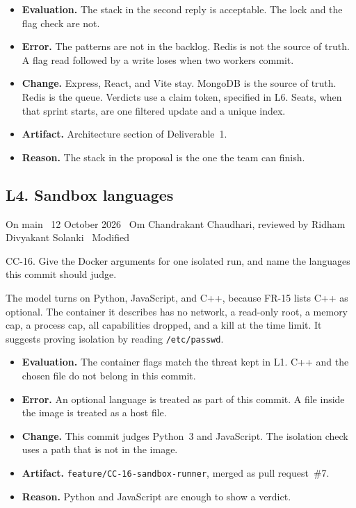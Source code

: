 \documentclass[11pt,a4paper]{article}
\newcommand{\meta}[1]{{\footnotesize\color{quiet}#1}\par\vspace{0.2em}}
\newcommand{\step}[1]{\par\vspace{0.45em}{\bfseries #1}\par\vspace{0.05em}}
\begin{document}
\step{5. Decision}
\begin{itemize}
\item \textbf{Evaluation.} The stack in the second reply is acceptable. The lock and the flag check are not.
\item \textbf{Error.} The patterns are not in the backlog. Redis is not the source of truth. A flag read followed by a write loses when two workers commit.
\item \textbf{Change.} Express, React, and Vite stay. MongoDB is the source of truth. Redis is the queue. Verdicts use a claim token, specified in L6. Seats, when that sprint starts, are one filtered update and a unique index.
\item \textbf{Artifact.} Architecture section of Deliverable~1.
\item \textbf{Reason.} The stack in the proposal is the one the team can finish.
\end{itemize}

\subsection{L4. Sandbox languages}
\meta{On main \textperiodcentered\ 12 October 2026 \textperiodcentered\ Om Chandrakant Chaudhari, reviewed by Ridham Divyakant Solanki \textperiodcentered\ Modified}

\step{1. Prompt}
CC-16. Give the Docker arguments for one isolated run, and name the languages this commit should judge.

\step{2. Reply (summarised)}
The model turns on Python, JavaScript, and C++, because FR-15 lists C++ as optional. The container it describes has no network, a read-only root, a memory cap, a process cap, all capabilities dropped, and a kill at the time limit. It suggests proving isolation by reading \texttt{/etc/passwd}.

\step{3. Decision}
\begin{itemize}
\item \textbf{Evaluation.} The container flags match the threat kept in L1. C++ and the chosen file do not belong in this commit.
\item \textbf{Error.} An optional language is treated as part of this commit. A file inside the image is treated as a host file.
\item \textbf{Change.} This commit judges Python~3 and JavaScript. The isolation check uses a path that is not in the image.
\item \textbf{Artifact.} \texttt{feature/CC-16-sandbox-runner}, merged as pull request~\#7.
\item \textbf{Reason.} Python and JavaScript are enough to show a verdict.
\end{itemize}
\end{document}
